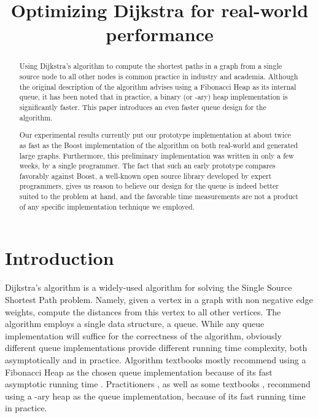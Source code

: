 \documentclass[conference,10pt,twocolumn]{IEEEtran}
\begin{document}
\title{Optimizing {D}ijkstra for real-world performance}

\author{
}







\maketitle

\begin{abstract}

Using Dijkstra's algorithm to compute the shortest paths in a graph from a single source node to all other nodes is common practice in industry and academia. Although the original description of the algorithm advises using a Fibonacci Heap as its internal queue, it has been noted that in practice, a binary (or -ary) heap implementation is significantly faster. This paper introduces an even faster queue design for the algorithm. 

Our experimental results currently put our prototype implementation at about twice as fast as the Boost implementation of the algorithm on both real-world and generated large graphs. Furthermore, this preliminary implementation was written in only a few weeks, by a single programmer. The fact that such an early prototype compares favorably against Boost, a well-known open source library developed by expert programmers, gives us reason to believe our design for the queue is indeed better suited to the problem at hand, and the favorable time measurements are not a product of any specific implementation technique we employed.

\end{abstract}

\section{Introduction}

Dijkstra's algorithm is a widely-used algorithm for solving the Single Source Shortest Path problem. Namely, given a vertex in a graph with non negative edge weights, compute the distances from this vertex to all other vertices. The algorithm employs a single data structure, a queue.  While any queue implementation will suffice for the correctness of the algorithm, obviously different queue implementations provide different running time complexity, both asymptotically and in practice. Algorithm textbooks mostly recommend using a Fibonacci Heap as the chosen queue implementation because of its fast asymptotic running time \cite{Cormen90}. Practitioners \cite{Boost}, as well as some textbooks \cite{Cormen90}, recommend using a -ary heap as the queue implementation, because of its fast running time in practice.
\end{document}
